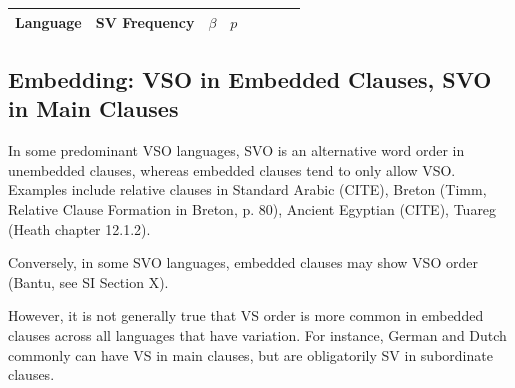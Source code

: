 \documentclass[11pt,a4paper]{article}
\begin{document}
\begin{longtable}{l|lllllll}
Language & SV Frequency & $\beta$ & $p$ \\ \hline

\end{longtable}


\subsection{Embedding: VSO in Embedded Clauses, SVO in Main Clauses}
In some predominant VSO languages, SVO is an alternative word order in unembedded clauses, whereas embedded clauses tend to only allow VSO.
Examples include relative clauses in Standard Arabic (CITE), Breton (Timm, Relative Clause Formation in Breton, p. 80), Ancient Egyptian (CITE), Tuareg (Heath chapter 12.1.2).


Conversely, in some SVO languages, embedded clauses may show VSO order (Bantu, see SI Section X).

However, it is not generally true that VS order is more common in embedded clauses across all languages that have variation. For instance, German and Dutch commonly can have VS in main clauses, but are obligatorily SV in subordinate clauses.

\end{document}
